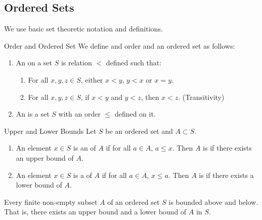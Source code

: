 \documentclass[openany]{book}
\begin{document}
\subsection{Ordered Sets}
We use basic set theoretic notation and definitions.
\begin{mydefinition}{Order and Ordered Set}
    We define and order and an ordered set as follows:
    \begin{enumerate}
    \item An  on a set $S$ is relation $<$ defined such that:
    \begin{enumerate}
        \item For all $x, y, z \in S$, either $x < y$, $y < x$ or $x = y$.
        \item For all $x, y, z \in S$, if $x < y$ and $y < z$, then $x < z$. (Transitivity)
    \end{enumerate}
    \item An  is a set $S$ with an order $\leq$ defined on it.
    \end{enumerate}
\end{mydefinition}
\begin{mydefinition}{Upper and Lower Bounds}
    Let $S$ be an ordered set and $A \subset S$.
    \begin{enumerate}
        \item An element $x \in S$ is an  of $A$ if for all $a \in A$, $a \leq x$. Then $A$ is  if there exists an upper bound of $A$.
        \item An element $x \in S$ is a  of $A$ if for all $a \in A$, $x \leq a$. Then $A$ is  if there exists a lower bound of $A$.
    \end{enumerate}
\end{mydefinition}
\begin{mytheorem}
    Every finite non-empty subset $A$ of an ordered set $S$ is bounded above and below. That is, there exists an upper bound and a lower bound of $A$ in $S$.
\end{mytheorem}
\end{document}
